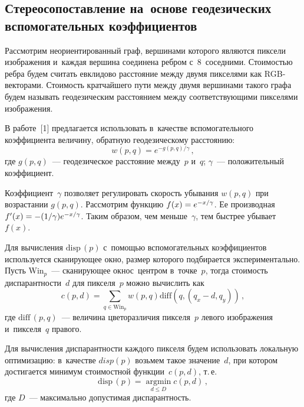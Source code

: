 \begin{multicols}{2}
\vspace*{-9pt}
  
\section{Стереосопоставление на~основе геодезических 
вспомогательных коэффициентов}

\vspace*{-2pt}
  
  Рассмотрим неориентированный граф, вершинами которого являются 
пиксели изображения и~каждая вершина соединена ребром с~8~соседними. 
Стоимостью ребра будем считать евклидово расстояние между двумя 
пикселями как RGB-век\-то\-ра\-ми. Стоимость кратчайшего пути между двумя 
вершинами такого графа будем называть геодезическим расстоянием между 
соответствующими пикселями изображения.
  
  В работе~[1] предлагается использовать в~качестве вспомогательного 
коэффициента величину, обратную геодезическому расстоянию:
  \begin{equation}
  w(p,q) =e^{-g(p,q)/\gamma}\,,
  \label{1-ya}
  \end{equation}
     где $g(p,q)$~--- геодезическое расстояние между~$p$ и~$q$;  
$\gamma$~--- положительный коэффициент.

Коэффициент~$\gamma$ позволяет регулировать скорость убывания $w(p,q)$ 
при возрастании $g(p,q)$. Рассмотрим функцию $f(x)\hm= e^{-x/\gamma}$. Ее 
производная $f^\prime(x)\hm= -(1/\gamma) e^{-x/\gamma}$. Таким образом, чем 
меньше~$\gamma$, тем быстрее убывает~$f(x)$.
  
  Для вычисления $\mathrm{disp}\,(p)$ с~помощью вспомогательных коэффициентов 
используется ска\-ни\-ру\-ющее окно, размер которого подбирается 
экспериментально. Пусть Win$_p$~--- сканирующее окно\linebreak с~центром 
в~точке~$p$, тогда стоимость диспарантности~$d$ для пикселя~$p$ можно 
вычислить как
  $$
  c(p,d) =\sum\limits_{q\in \mathrm{Win}_p} w(p,q)  \mathrm{diff} \left(q,\left(q_x-d, q_y\right ) 
\right)\,,
  $$
  где $\mathrm{diff}\,(p,q)$~--- величина цветоразличия пикселя~$p$ левого изображения 
и~пикселя~$q$ правого.
  
  Для вычисления диспарантности каждого пикселя будем использовать 
локальную оптимизацию: в~качестве $disp(p)$ возьмем такое значение~$d$, при 
котором достигается минимум стоимостной функции~$c(p,d)$, т.\,е.
  $$
  \mathrm{disp}\,(p)=\mathop{\mathrm{argmin}}\limits_{d\leq D} c(p,d)\,,
  $$
  где $D$~--- максимально допустимая диспарантность.
  

\end{multicols}
